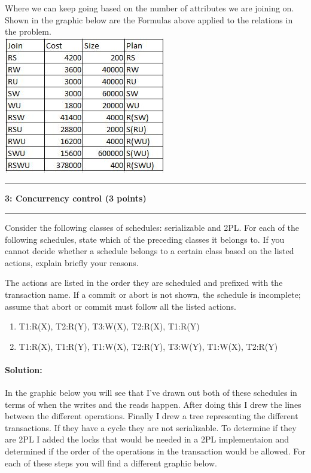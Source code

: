 \documentclass[11pt]{article}
\newcommand\question[2]{\vspace{.25in}\hrule\textbf{#1: #2}\vspace{.5em}\hrule\vspace{.10in}}
\begin{document}
Where we can keep going based on the number of attributes we are joining on. Shown in the graphic below are the Formulas above applied to the relations in the problem.\\

\includegraphics{JoinPlan.JPG}



\question{3}{Concurrency control (3 points)}
Consider the following classes of schedules: serializable and 2PL. 
For each of the following schedules, state which of the preceding classes it belongs to. 
If you cannot decide whether a schedule belongs to a certain class based on the listed actions, explain briefly your reasons.

The actions are listed in the order they are scheduled and prefixed with the transaction name. 
If a commit or abort is not shown, the schedule is incomplete; assume that abort or commit must follow all the listed actions.\\


\begin{enumerate}
\item T1:R(X), T2:R(Y), T3:W(X), T2:R(X), T1:R(Y)
\item T1:R(X), T1:R(Y), T1:W(X), T2:R(Y), T3:W(Y), T1:W(X), T2:R(Y)
\end{enumerate}

\paragraph{Solution:} \hfill \break
	In the graphic below you will see that I've drawn out both of these schedules in terms of when the writes and the reads happen. After doing this I drew the lines between the different operations. Finally I drew a tree representing the different transactions. If they have a cycle they are not serializable. To determine if they are 2PL I added the locks that would be needed in a 2PL implementaion and determined if the order of the operations in the transaction would be allowed. For each of these steps you will find a different graphic below.\\
\end{document}
